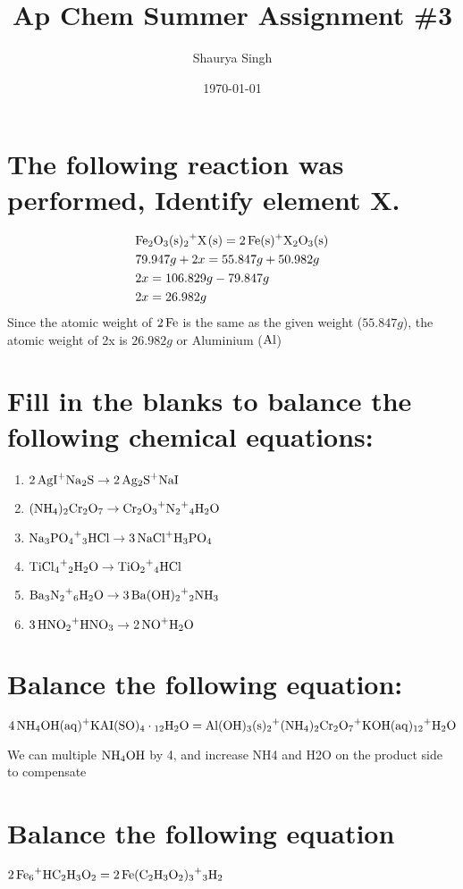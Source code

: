 \documentclass{scrartcl}
\author{Shaurya Singh}
\date{\today}
\title{Ap Chem Summer Assignment \#3}
\begin{document}
\maketitle

\section{The following reaction was performed, Identify element X.}
\label{sec:org7e5c477}
\begin{align*}
  &\ce{Fe2O_3(s)+2X(s)} = \ce{2Fe(s)+X_2O_3(s)}\\
  &79.947g+2x=55.847g+50.982g\\
  &2x=106.829g-79.847g\\
  &2x=26.982g\\
\end{align*}
Since the atomic weight of \(\ce{2Fe}\) is the same as the given weight
(\(55.847g\)), the atomic weight of 2x is \(26.982g\) or Aluminium (\(\ce{Al}\))

\section{Fill in the blanks to balance the following chemical equations:}
\label{sec:org93c2d7a}
\begin{enumerate}
\item \(\ce{2AgI+Na2S} \rightarrow \ce{2Ag2S+NaI}\)
\item \(\ce{(NH4)2Cr2O7} \rightarrow \ce{Cr2O3+N2+4H2O}\)
\item \(\ce{Na3PO4+3HCl} \rightarrow \ce{3NaCl+H3PO4}\)
\item \(\ce{TiCl4+2H2O} \rightarrow \ce{TiO2+4HCl}\)
\item \(\ce{Ba3N2+6H2O} \rightarrow \ce{3Ba(OH)2+2NH3}\)
\item \(\ce{3HNO2+HNO3} \rightarrow \ce{2NO+H2O}\)
\end{enumerate}

\section{Balance the following equation:}
\label{sec:orgb067686}
\(\ce{4NH4OH(aq)+KAI(SO)4\cdot12H2O}=\ce{Al(OH)3(s)+2(NH4)2Cr2O7+KOH(aq)+12H2O}\)

We can multiple \(\ce{NH4OH}\) by 4, and increase NH4 and H2O on the product
side to compensate

\section{Balance the following equation}
\label{sec:org99f094f}
\(\ce{2Fe+6HC2H3O2}=\ce{2Fe(C2H3O2)3+3H2}\)
\end{document}
